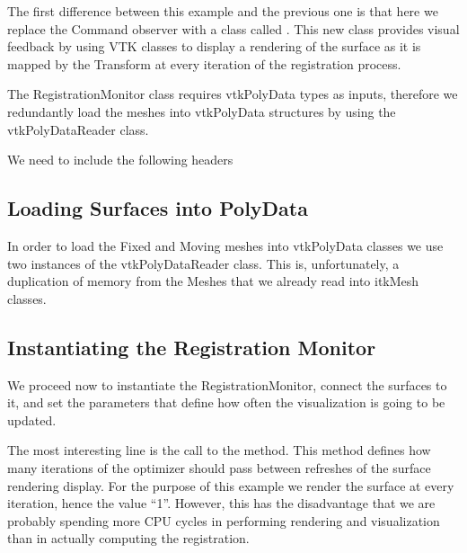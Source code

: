 \documentclass{InsightArticle}
\begin{document}
The first difference between this example and the previous one is that here we
replace the Command observer with a class called .
This new class provides visual feedback by using VTK classes to display a
rendering of the surface as it is mapped by the Transform at every iteration of
the registration process.

The RegistrationMonitor class requires vtkPolyData types as inputs, therefore
we redundantly load the meshes into vtkPolyData structures by using the
vtkPolyDataReader class.

We need to include the following headers

\begin{center}

\end{center}


\subsection{Loading Surfaces into PolyData}

In order to load the Fixed and Moving meshes into vtkPolyData classes we use
two instances of the vtkPolyDataReader class. This is, unfortunately, a
duplication of memory from the Meshes that we already read into itkMesh classes.

\begin{center}

\end{center}


\subsection{Instantiating the Registration Monitor}

We proceed now to instantiate the RegistrationMonitor, connect the surfaces to
it, and set the parameters that define how often the visualization is going to
be updated.

\begin{center}

\end{center}

The most interesting line is the call to the
 method. This method defines how many
iterations of the optimizer should pass between refreshes of the surface
rendering display. For the purpose of this example we render the surface at
every iteration, hence the value ``1''. However, this has the disadvantage that
we are probably spending more CPU cycles in performing rendering and
visualization than in actually computing the registration.
\end{document}

